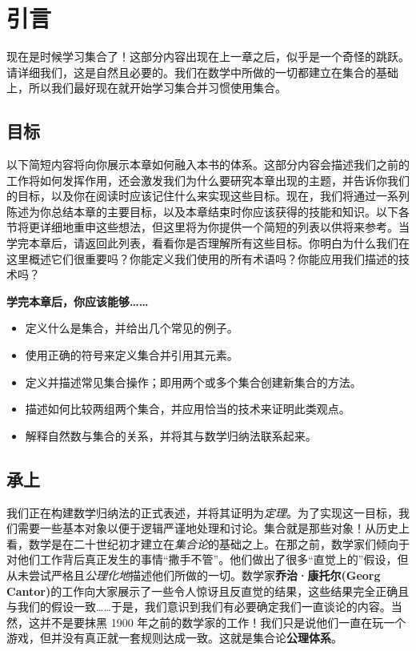 \section{引言}

现在是时候学习集合了！这部分内容出现在上一章之后，似乎是一个奇怪的跳跃。请详细我们，这是自然且必要的。我们在数学中所做的一切都建立在集合的基础上，所以我们最好现在就开始学习集合并习惯使用集合。

\subsection{目标}

以下简短内容将向你展示本章如何融入本书的体系。这部分内容会描述我们之前的工作将如何发挥作用，还会激发我们为什么要研究本章出现的主题，并告诉你我们的目标，以及你在阅读时应该记住什么来实现这些目标。现在，我们将通过一系列陈述为你总结本章的主要目标，以及本章结束时你应该获得的技能和知识。以下各节将更详细地重申这些想法，但这里将为你提供一个简短的列表以供将来参考。当学完本章后，请返回此列表，看看你是否理解所有这些目标。你明白为什么我们在这里概述它们很重要吗？你能定义我们使用的所有术语吗？你能应用我们描述的技术吗？

\textbf{学完本章后，你应该能够……}

\begin{itemize}
    \item 定义什么是集合，并给出几个常见的例子。
    \item 使用正确的符号来定义集合并引用其元素。
    \item 定义并描述常见集合操作；即用两个或多个集合创建新集合的方法。
    \item 描述如何比较两组两个集合，并应用恰当的技术来证明此类观点。
    \item 解释自然数与集合的关系，并将其与数学归纳法联系起来。
\end{itemize}

\subsection{承上}

我们正在构建数学归纳法的正式表述，并将其证明为\emph{定理}。为了实现这一目标，我们需要一些基本对象以便于逻辑严谨地处理和讨论。集合就是那些对象！从历史上看，数学是在二十世纪初才建立在\emph{集合论}的基础之上。在那之前，数学家们倾向于对他们工作背后真正发生的事情``撒手不管''。他们做出了很多``直觉上的''假设，但从未尝试严格且\emph{公理化地}描述他们所做的一切。数学家\textbf{乔治·康托尔(Georg Cantor)}的工作向大家展示了一些令人惊讶且反直觉的结果，这些结果完全正确且与我们的假设一致……于是，我们意识到我们有必要确定我们一直谈论的内容。当然，这并不是要抹黑 1900 年之前的数学家的工作！我们只是说他们一直在玩一个游戏，但并没有真正就一套规则达成一致。这就是集合论\textbf{公理体系}。

